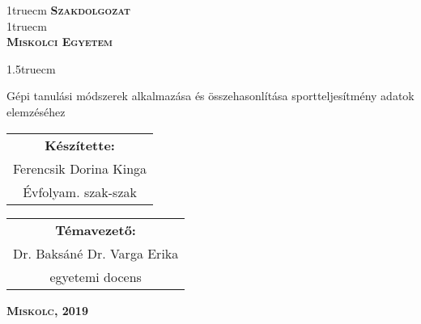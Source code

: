 \pagestyle{empty} %

{\large
\begin{center}
\vglue 1truecm
\textbf{\huge\textsc{Szakdolgozat}}\\
\vglue 1truecm
\\
\textbf{\textsc{Miskolci Egyetem}}
\end{center}}

\vglue 1.5truecm %

{\LARGE
\begin{center}
	Gépi tanulási módszerek alkalmazása és összehasonlítása sportteljesítmény adatok elemzéséhez
\end{center}}

\vspace*{2.5truecm}
{\large
\begin{center}
\begin{tabular}{c}
\textbf{Készítette:}\\
Ferencsik Dorina Kinga\\
Évfolyam. szak-szak
\end{tabular}
\end{center}
\begin{center}
\begin{tabular}{c}
\textbf{Témavezető:}\\
Dr. Baksáné Dr. Varga Erika\\
egyetemi docens
\end{tabular}
\end{center}}
\vfill
{\large
\begin{center}
\textbf{\textsc{Miskolc, 2019}}
\end{center}}

\newpage
